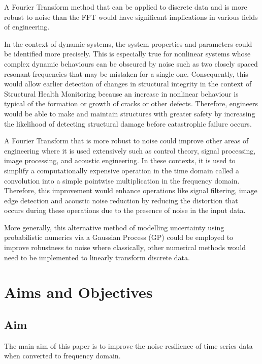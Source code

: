 \documentclass[12pt]{article}
\begin{document}
    A Fourier Transform method that can be applied to discrete data and is more robust to noise than the FFT would have significant implications in various fields of engineering.

    In the context of dynamic systems, the system properties and parameters could be identified more precisely.
    This is especially true for nonlinear systems whose complex dynamic behaviours can be obscured by noise such as two closely spaced resonant frequencies that may be mistaken for a single one.
    Consequently, this would allow earlier detection of changes in structural integrity in the context of Structural Health Monitoring because an increase in nonlinear behaviour is typical of the formation or growth of cracks or other defects.
    Therefore, engineers would be able to make and maintain structures with greater safety by increasing the likelihood of detecting structural damage before catastrophic failure occurs.

    A Fourier Transform that is more robust to noise could improve other areas of engineering where it is used extensively such as control theory, signal processing, image processing, and acoustic engineering.
    In these contexts, it is used to simplify a computationally expensive operation in the time domain called a convolution into a simple pointwise multiplication in the frequency domain.
    Therefore, this improvement would enhance operations like signal filtering, image edge detection and acoustic noise reduction by reducing the distortion that occurs during these operations due to the presence of noise in the input data.

    More generally, this alternative method of modelling uncertainty using probabilistic numerics via a Gaussian Process (GP) could be employed to improve robustness to noise where classically, other numerical methods would need to be implemented to linearly transform discrete data.

    \section{Aims and Objectives}
    \subsection{Aim}
    The main aim of this paper is to improve the noise resilience of time series data when converted to frequency domain.
\end{document}
